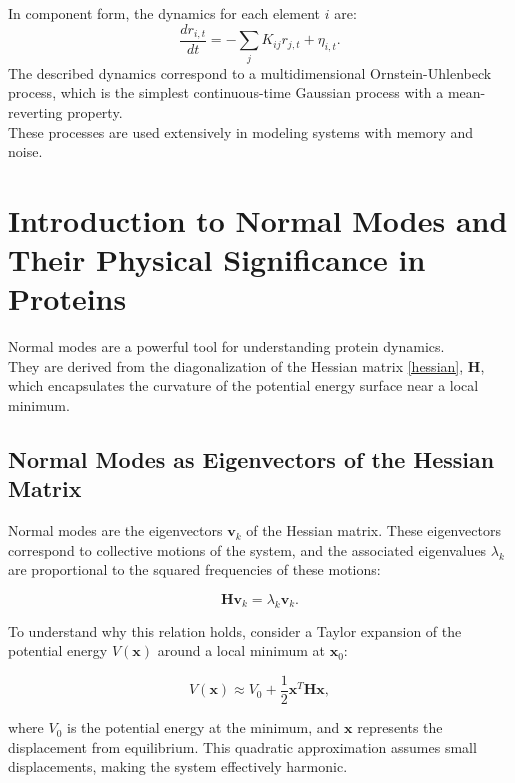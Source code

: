 \documentclass[English, Lau, oneside]{sapthesis}
\begin{document}
In component form, the dynamics for each element \( i \) are:
\begin{equation}
    \frac{d r_{i,t}}{dt} = -\sum_j K_{ij} r_{j,t} + \eta_{i,t}.
\end{equation}
The described dynamics correspond to a multidimensional Ornstein-Uhlenbeck process, which is the simplest continuous-time Gaussian process with a mean-reverting property.\\
These processes are used extensively in modeling systems with memory and noise.\\

\newpage
\section{Introduction to Normal Modes and Their Physical Significance in Proteins}

Normal modes are a powerful tool for understanding protein dynamics. \\
They are derived from the diagonalization of the Hessian matrix \eqref{hessian}, \( \mathbf{H} \), which encapsulates the curvature of the potential energy surface near a local minimum. 

\subsection{Normal Modes as Eigenvectors of the Hessian Matrix}

Normal modes are the eigenvectors \( \mathbf{v}_k \) of the Hessian matrix. These eigenvectors correspond to collective motions of the system, and the associated eigenvalues \( \lambda_k \) are proportional to the squared frequencies of these motions:

\begin{equation}
\mathbf{H} \mathbf{v}_k = \lambda_k \mathbf{v}_k.
\end{equation}

To understand why this relation holds, consider a Taylor expansion of the potential energy \( V(\mathbf{x}) \) around a local minimum at \( \mathbf{x}_0 \):

\begin{equation}
V(\mathbf{x}) \approx V_0 + \frac{1}{2} \mathbf{x}^T \mathbf{H} \mathbf{x},
\end{equation}

where \( V_0 \) is the potential energy at the minimum, and \( \mathbf{x} \) represents the displacement from equilibrium. This quadratic approximation assumes small displacements, making the system effectively harmonic.
\end{document}
